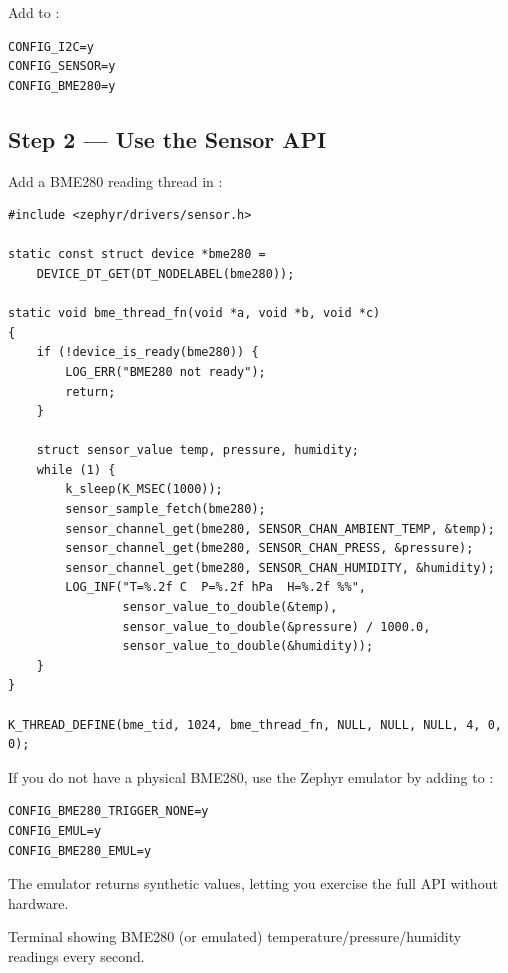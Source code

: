\documentclass[11pt, a4paper]{article}
\begin{document}
Add to :

\begin{lstlisting}[style=textstyle]
CONFIG_I2C=y
CONFIG_SENSOR=y
CONFIG_BME280=y
\end{lstlisting}

\subsection{Step 2 --- Use the Sensor API}

Add a BME280 reading thread in :

\begin{lstlisting}[style=cstyle]
#include <zephyr/drivers/sensor.h>

static const struct device *bme280 =
    DEVICE_DT_GET(DT_NODELABEL(bme280));

static void bme_thread_fn(void *a, void *b, void *c)
{
    if (!device_is_ready(bme280)) {
        LOG_ERR("BME280 not ready");
        return;
    }

    struct sensor_value temp, pressure, humidity;
    while (1) {
        k_sleep(K_MSEC(1000));
        sensor_sample_fetch(bme280);
        sensor_channel_get(bme280, SENSOR_CHAN_AMBIENT_TEMP, &temp);
        sensor_channel_get(bme280, SENSOR_CHAN_PRESS, &pressure);
        sensor_channel_get(bme280, SENSOR_CHAN_HUMIDITY, &humidity);
        LOG_INF("T=%.2f C  P=%.2f hPa  H=%.2f %%",
                sensor_value_to_double(&temp),
                sensor_value_to_double(&pressure) / 1000.0,
                sensor_value_to_double(&humidity));
    }
}

K_THREAD_DEFINE(bme_tid, 1024, bme_thread_fn, NULL, NULL, NULL, 4, 0, 0);
\end{lstlisting}

\begin{warnbox}
  If you do not have a physical BME280, use the Zephyr emulator by adding to
  :
  \begin{lstlisting}[style=textstyle, aboveskip=2pt, belowskip=0pt]
CONFIG_BME280_TRIGGER_NONE=y
CONFIG_EMUL=y
CONFIG_BME280_EMUL=y
  \end{lstlisting}
  The emulator returns synthetic values, letting you exercise the full API without
  hardware.
\end{warnbox}

\begin{checkpointbox}[~C]
  Terminal showing BME280 (or emulated) temperature/pressure/humidity readings every
  second.
\end{checkpointbox}
\end{document}
